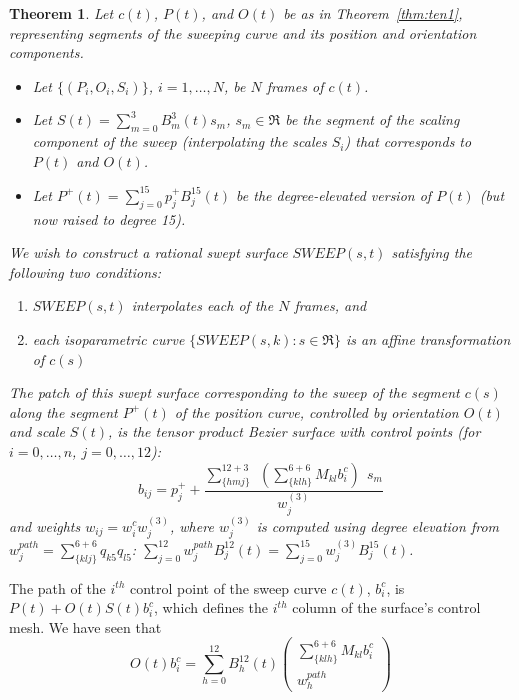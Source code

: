 \documentclass[times]{article}
\newcommand{\prf}{\noindent{{\bf Proof} :\ }}
\newtheorem{theorem}{Theorem}[section]
\begin{document}
\begin{theorem}
\label{thm:ten2}
Let $c(t)$, $P(t)$, and $O(t)$ be as in Theorem~\ref{thm:ten1},
representing segments of the sweeping curve and its position and orientation components.
\begin{itemize}
\item
Let $\{(P_i,O_i,S_i)\}$, $i=1,\ldots,N$, be $N$ frames of $c(t)$.
\item
Let $S(t) = \sum_{m=0}^{3} B_m^3(t) s_m$, $s_m \in \Re$
be the segment of the scaling component of the sweep (interpolating the scales
$S_i$) that corresponds to $P(t)$ and $O(t)$.
\item
Let $P^{+}(t) = \sum_{j=0}^{15} p_j^{+} B_j^{15}(t)$
be the degree-elevated version of $P(t)$ (but now raised to degree 15).
\end{itemize}

We wish to construct a rational swept surface $SWEEP(s,t)$ satisfying 
the following two conditions:
\begin{enumerate}
\item $SWEEP(s,t)$ interpolates each of the $N$ frames, and
\item  each isoparametric curve $\{SWEEP(s,k) : s \in \Re \}$
	is an affine transformation of $c(s)$
\end{enumerate}
The patch of this swept surface corresponding to the sweep of the segment
$c(s)$ along the segment $P^{+}(t)$ of the position curve, controlled 
by orientation $O(t)$ and scale $S(t)$, 
is the tensor product Bezier surface with control points
(for $i=0,\ldots,n$, $j=0,\ldots,12$):
\[
b_{ij} = p_j^{+} + \frac{\sum_{\{hmj\}}^{12+3} \ \ 
		(\sum_{\{klh\}}^{6+6} M_{kl} b_i^c) \ \ s_m}{w^{(3)}_j}
\]
and weights $w_{ij} = w_i^c  w^{(3)}_j$,
where $w^{(3)}_j$ is computed using degree elevation from 
$w_j^{path} = \sum_{\{klj\}}^{6+6} q_{k5} q_{l5}$:
$\sum_{j=0}^{12} w_j^{path} B_j^{12}(t) = 
   \sum_{j=0}^{15} w_j^{(3)}  B_j^{15}(t)$.
\end{theorem}
\prf
The path of the $i^{th}$ control point of the sweep curve $c(t)$,
$b_i^c$, is $P(t) + O(t)S(t)b_i^c$,
which defines the $i^{th}$ column of the surface's control mesh.
We have seen that 
\[
O(t) b_i^c = 	\sum_{h=0}^{12} B_h^{12}(t) 
	\left(	\begin{array}{c}
	\sum_{\{klh\}}^{6+6} M_{kl} b_i^c \\ w_h^{path}
	\end{array} \right)
\]
\end{document}
